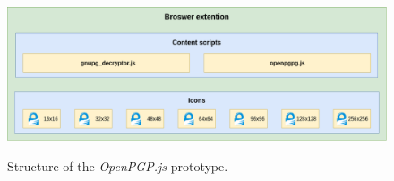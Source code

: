 \begin{figure}[H]
    \begin{center}
        \label{img:openpgpAnatomy}
        \includegraphics[width=1.0\textwidth]{obrazky-figures/prototype-openpgpjs.png}
        \caption{Structure of the \textit{OpenPGP.js} prototype.}
    \end{center}
\end{figure}

